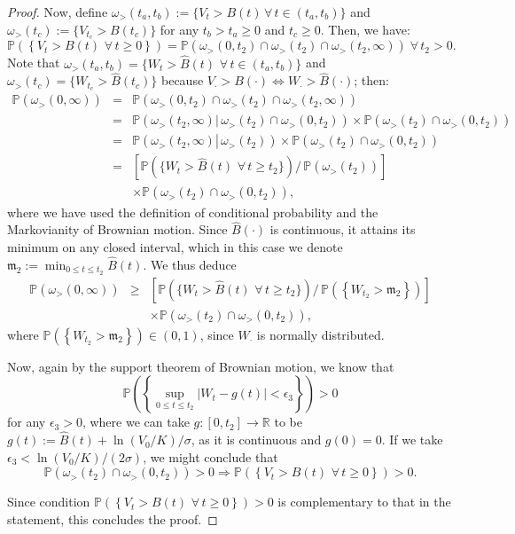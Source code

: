 \documentclass[12pt]{article}
\theoremstyle{definition}
\begin{document}
\begin{proof}
Now, define $\omega_>(t_a,t_b):=\{ V_t > {B}(t) \, \forall \, t\in (t_a,t_b)\}$ and $\omega_>(t_c):=\{ V_{t_c} > {B}(t_c)\}$ for any $t_b > t_a \ge 0$ and $t_c \ge 0$. Then, we have:
$$ 
 \mathbb{P}\left( \left\{ V_t > B(t) \,\, \forall \, t \ge 0 \right\} \right) =
 \mathbb{P}\left( \omega_>(0,t_2) \cap \omega_>(t_2) \cap\omega_>(t_2,\infty) \right)\;\forall \, t_2 >0.
$$
Note that $\omega_>(t_a,t_b)=\{ W_t > \hat{B}(t) \,\, \forall \, t\in (t_a,t_b)\}$ and $\omega_>(t_c)=\{ W_{t_c} > \hat{B}(t_c)\}$ because $V_\cdot > B(\cdot) \Leftrightarrow W_\cdot > \hat{B}(\cdot)$; then:
\begin{eqnarray}\nonumber
\mathbb{P}\left( \omega_>(0,\infty)\right) &=&
\mathbb{P}\left( \omega_>(0,t_2) \cap \omega_>(t_2) \cap \omega_>(t_2,\infty) \right) \\ \nonumber
&=& \mathbb{P}\left(\omega_>(t_2,\infty)| \, \omega_>(t_2) \cap \omega_>(0,t_2) \right)
 \times \mathbb{P}\left( \omega_>(t_2) \cap \omega_>(0,t_2)\right)
\\ \nonumber
&=& \mathbb{P}\left( \omega_>(t_2,\infty) \left| \, \omega_>(t_2) \right. \right) 
\times \mathbb{P}\left( \omega_>(t_2) \cap \omega_>(0,t_2) \right)
\\ \nonumber
&=& \left[ \mathbb{P}\left(\{ W_t > \hat{B}(t) \,\, \forall \, t \ge t_2 \}\right) \Big/ \, \mathbb{P}\left(\omega_>(t_2)\right) \right]
\\ \nonumber
&& \times \mathbb{P}\left( \omega_>(t_2) \cap \omega_>(0,t_2) \right),
\end{eqnarray}
where we have used the definition of conditional probability and the Markovianity of Brownian motion. Since $\hat{B}(\cdot)$ is continuous, it attains its minimum on any closed interval, which in this case we denote
$\mathfrak{m}_2:= \min_{0 \le t \le t_2} \hat{B}(t)$. We thus deduce
\begin{eqnarray}\nonumber
 \mathbb{P}\left(\omega_>(0,\infty) \right) &\ge& \left[ \mathbb{P}\left(\{ W_t > \hat{B}(t) \,\, \forall \, t \ge t_2 \}\right) \Big/ \, \mathbb{P}\left(\left\{ W_{t_2} > \mathfrak{m}_2 \right\}\right) \right]
\\ \nonumber
&& \times \mathbb{P}\left( \omega_>(t_2) \cap \omega_>(0,t_2) \right),
\end{eqnarray}
where $\mathbb{P}\left(\left\{ W_{t_2} > \mathfrak{m}_2 \right\}\right) \in (0,1)$, since $W_{\cdot}$ is normally distributed. 

Now, again by the support theorem of Brownian motion, we know that
$$
\mathbb{P} \left( \left\{ \sup_{0 \le t \le t_2} |W_t - g(t)| < \epsilon_3 \right\} \right) >0
$$
for any $\epsilon_3 >0$, where we can take $g:[0,t_2] \longrightarrow \mathbb{R}$ to be $g(t):= \hat{B}(t)+\ln(V_0/K)/\sigma$, as it is continuous and $g(0)=0$. If we take $\epsilon_3 < \ln(V_0/K)/(2\sigma)$, we might conclude that
$$
\mathbb{P}\left( \omega_>(t_2) \cap \omega_>(0,t_2) \right)>0
\Longrightarrow
\mathbb{P} \left( \left\{ V_t > B(t) \,\, \forall \, t \ge 0 \right\} \right) >0.
$$

Since condition $\mathbb{P} \left( \left\{ V_t > B(t) \,\, \forall \, t \ge 0 \right\} \right) >0$ is complementary to that in the statement, this concludes the proof.
\end{proof}
\end{document}
